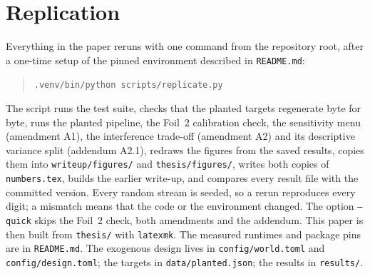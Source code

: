 \section{Replication}\label{app:replication}

Everything in the paper reruns with one command from the repository root, after a
one-time setup of the pinned environment described in \texttt{README.md}:
\begin{quote}
\texttt{.venv/bin/python scripts/replicate.py}
\end{quote}
The script runs the test suite, checks that the planted targets regenerate byte for
byte, runs the planted pipeline, the Foil~2 calibration check, the sensitivity menu
(amendment A1), the interference trade-off (amendment A2) and its descriptive
variance split (addendum A2.1), redraws the figures
from the saved results, copies them into \texttt{writeup/figures/} and
\texttt{thesis/figures/}, writes both copies of \texttt{numbers.tex}, builds the
earlier write-up, and compares every result file with the committed version. Every
random stream is seeded, so a rerun reproduces every digit; a mismatch means that
the code or the environment changed. The option \texttt{--quick} skips the Foil~2
check, both amendments and the addendum. This paper is then built from \texttt{thesis/} with
\texttt{latexmk}. The measured runtimes and package pins are in
\texttt{README.md}. The exogenous design lives in \texttt{config/world.toml} and
\texttt{config/design.toml}; the targets in \texttt{data/planted.json}; the results
in \texttt{results/}.


